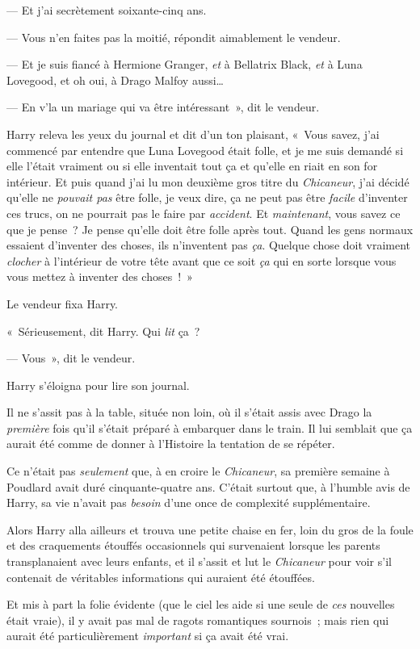 --- Et j'ai secrètement soixante-cinq ans.

--- Vous n'en faites pas la moitié, répondit aimablement le vendeur.

--- Et je suis fiancé à Hermione Granger, \emph{et} à Bellatrix Black, \emph{et} à Luna Lovegood, et oh oui, à Drago Malfoy aussi…

--- En v'la un mariage qui va être intéressant~», dit le vendeur.

Harry releva les yeux du journal et dit d'un ton plaisant, «~Vous savez, j'ai commencé par entendre que Luna Lovegood était folle, et je me suis demandé si elle l'était vraiment ou si elle inventait tout ça et qu'elle en riait en son for intérieur. Et puis quand j'ai lu mon deuxième gros titre du \emph{Chicaneur}, j'ai décidé qu'elle ne \emph{pouvait pas} être folle, je veux dire, ça ne peut pas être \emph{facile} d'inventer ces trucs, on ne pourrait pas le faire par \emph{accident}. Et \emph{maintenant}, vous savez ce que je pense~? Je pense qu'elle doit être folle après tout. Quand les gens normaux essaient d'inventer des choses, ils n'inventent pas \emph{ça}. Quelque chose doit vraiment \emph{clocher} à l'intérieur de votre tête avant que ce soit \emph{ça} qui en sorte lorsque vous vous mettez à inventer des choses~!~»

Le vendeur fixa Harry.

«~Sérieusement, dit Harry. Qui \emph{lit} ça~?

--- Vous~», dit le vendeur.

Harry s'éloigna pour lire son journal.

Il ne s'assit pas à la table, située non loin, où il s'était assis avec Drago la \emph{première} fois qu'il s'était préparé à embarquer dans le train. Il lui semblait que ça aurait été comme de donner à l'Histoire la tentation de se répéter.

Ce n'était pas \emph{seulement} que, à en croire le \emph{Chicaneur}, sa première semaine à Poudlard avait duré cinquante-quatre ans. C'était surtout que, à l'humble avis de Harry, sa vie n'avait pas \emph{besoin} d'une once de complexité supplémentaire.

Alors Harry alla ailleurs et trouva une petite chaise en fer, loin du gros de la foule et des craquements étouffés occasionnels qui survenaient lorsque les parents transplanaient avec leurs enfants, et il s'assit et lut le \emph{Chicaneur} pour voir s'il contenait de véritables informations qui auraient été étouffées.

Et mis à part la folie évidente (que le ciel les aide si une seule de \emph{ces} nouvelles était vraie), il y avait pas mal de ragots romantiques sournois~; mais rien qui aurait été particulièrement \emph{important} si ça avait été vrai.

